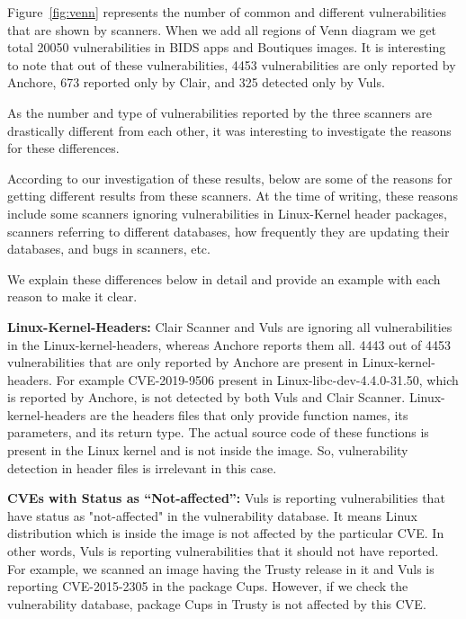 \documentclass[a4paper,num-refs]{oup-contemporary}
\begin{document}
Figure~\ref{fig:venn} represents the number of common and different vulnerabilities
that are shown by scanners.
When we add all regions of Venn diagram
we get total 20050 vulnerabilities in BIDS apps and Boutiques images.
It is interesting to note that out of these vulnerabilities, 4453 vulnerabilities are only
reported by Anchore, 673 reported only by Clair, and 325 detected only by Vuls.

As the number and type of vulnerabilities reported by the three scanners are drastically different from each other,
it was interesting to investigate the reasons for these differences.

According to our investigation of these results, below are some of the reasons for
getting different results from these scanners. At the time of writing, these reasons include
some scanners ignoring vulnerabilities in Linux-Kernel header packages, scanners referring to different databases,
how frequently they are updating their databases, and bugs in scanners, etc. 

We explain these differences below in detail
and provide an example with each reason to make it clear.

\textbf{Linux-Kernel-Headers:} Clair Scanner and Vuls are ignoring all vulnerabilities in the Linux-kernel-headers,
whereas Anchore reports them all.
4443 out of 4453 vulnerabilities that are only reported by Anchore are present in Linux-kernel-headers.
For example CVE-2019-9506 present in Linux-libc-dev-4.4.0-31.50, which is reported by Anchore, is not
detected by both Vuls and Clair Scanner.
Linux-kernel-headers are the headers files that only provide function names, its parameters, and its
return type.
The actual source code of these functions is present in the Linux kernel and is not inside the image.
So, vulnerability detection in header files
is irrelevant in this case.

\textbf{CVEs with Status as “Not-affected”:} Vuls is reporting vulnerabilities that have status
as "not-affected" in the vulnerability database. It means Linux distribution which is inside the image is not affected
by the particular CVE. In other words, Vuls is reporting vulnerabilities that it should not have reported.
For example, we scanned an image having the Trusty release in it and Vuls is reporting CVE-2015-2305
in the package Cups. However, if we check the vulnerability database, package Cups in Trusty is not
affected by this CVE.
\end{document}
